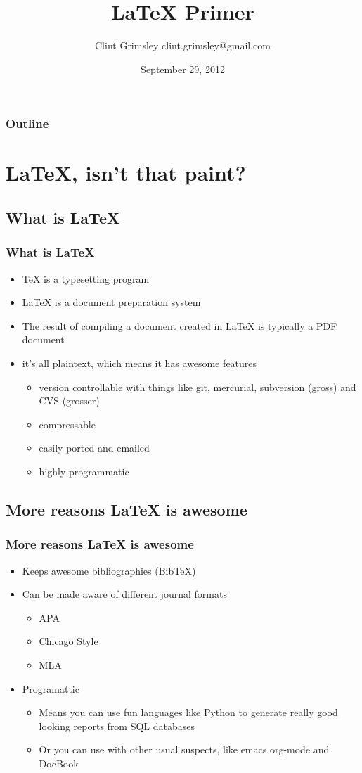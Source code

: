 \documentclass{beamer}
\title{LaTeX Primer}
\author{Clint Grimsley clint.grimsley@gmail.com}
\date{September 29, 2012}
\begin{document}
\begin{frame}
\titlepage
\end{frame}

\begin{frame}
  \frametitle{Outline}
    \tableofcontents
\end{frame}

\section{LaTeX, isn't that paint?}
\subsection{What is LaTeX}

\begin{frame}
\frametitle{What is LaTeX}
\begin{itemize}
  \item TeX is a typesetting program
  \item LaTeX is a document preparation system
  \item The result of compiling a document created in LaTeX is typically a PDF document
  \item it's all plaintext, which means it has awesome features
    \begin{itemize}
      \item version controllable with things like git, mercurial, subversion (gross) and CVS (grosser)
      \item compressable
      \item easily ported and emailed
      \item highly programmatic
    \end{itemize}
\end{itemize}
\end{frame}

\subsection{More reasons LaTeX is awesome}
\begin{frame}
  \frametitle{More reasons LaTeX is awesome}
  \begin{itemize}
    \item Keeps awesome bibliographies (BibTeX)
    \item Can be made aware of different journal formats
      \begin{itemize}
        \item APA
        \item Chicago Style
        \item MLA
      \end{itemize}
    \item Programattic
      \begin{itemize}
        \item Means you can use fun languages like Python to generate really good looking reports from SQL databases
        \item Or you can use with other usual suspects, like emacs org-mode and DocBook
      \end{itemize}
  \end{itemize}
\end{frame}
\end{document}
